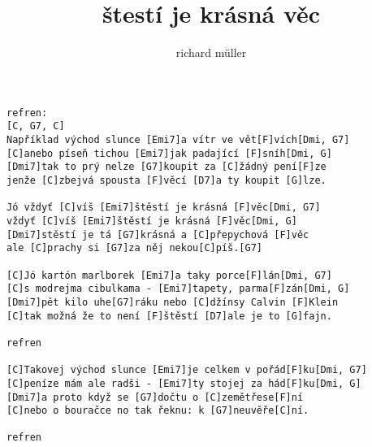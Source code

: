 \author{richard m\"uller}
\title{štestí je krásná věc}
\maketitle
\begin{verbatim}
refren:
[C, G7, C]
Například východ slunce [Emi7]a vítr ve vět[F]vích[Dmi, G7]
[C]anebo píseň tichou [Emi7]jak padající [F]sníh[Dmi, G]
[Dmi7]tak to prý nelze [G7]koupit za [C]žádný pení[F]ze
jenže [C]zbejvá spousta [F]věcí [D7]a ty koupit [G]lze.

Jó vždyť [C]víš [Emi7]štěstí je krásná [F]věc[Dmi, G7]
vždyť [C]víš [Emi7]štěstí je krásná [F]věc[Dmi, G]
[Dmi7]stěstí je tá [G7]krásná a [C]přepychová [F]věc
ale [C]prachy si [G7]za něj nekou[C]píš.[G7]

[C]Jó kartón marlborek [Emi7]a taky porce[F]lán[Dmi, G7]
[C]s modrejma cibulkama - [Emi7]tapety, parma[F]zán[Dmi, G]
[Dmi7]pět kilo uhe[G7]ráku nebo [C]džínsy Calvin [F]Klein
[C]tak možná že to není [F]štěstí [D7]ale je to [G]fajn.

refren

[C]Takovej východ slunce [Emi7]je celkem v pořád[F]ku[Dmi, G7]
[C]peníze mám ale radši - [Emi7]ty stojej za hád[F]ku[Dmi, G]
[Dmi7]a proto když se [G7]dočtu o [C]zemětřese[F]ní
[C]nebo o bouračce no tak řeknu: k [G7]neuvěře[C]ní.

refren
\end{verbatim}